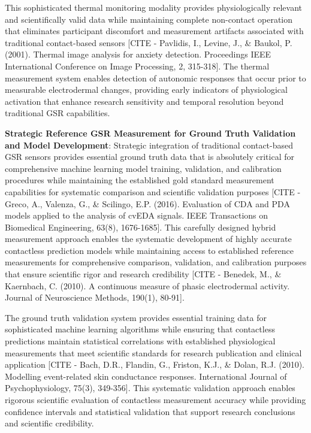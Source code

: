 \documentclass[11pt,a4paper]{report}
\begin{document}
This sophisticated thermal monitoring modality provides physiologically relevant and scientifically valid data while
maintaining complete non-contact operation that eliminates participant discomfort and measurement artifacts associated
with traditional contact-based
sensors [CITE - Pavlidis, I., Levine, J., \& Baukol, P. (2001). Thermal image analysis for anxiety detection. Proceedings IEEE International Conference on Image Processing, 2, 315-318].
The thermal measurement system enables detection of autonomic responses that occur prior to measurable electrodermal
changes, providing early indicators of physiological activation that enhance research sensitivity and temporal
resolution beyond traditional GSR capabilities.

\textbf{Strategic Reference GSR Measurement for Ground Truth Validation and Model Development}: Strategic integration of
traditional contact-based GSR sensors provides essential ground truth data that is absolutely critical for comprehensive
machine learning model training, validation, and calibration procedures while maintaining the established gold standard
measurement capabilities for systematic comparison and scientific validation
purposes [CITE - Greco, A., Valenza, G., \& Scilingo, E.P. (2016). Evaluation of CDA and PDA models applied to the analysis of cvEDA signals. IEEE Transactions on Biomedical Engineering, 63(8), 1676-1685].
This carefully designed hybrid measurement approach enables the systematic development of highly accurate contactless
prediction models while maintaining access to established reference measurements for comprehensive comparison,
validation, and calibration purposes that ensure scientific rigor and research
credibility [CITE - Benedek, M., \& Kaernbach, C. (2010). A continuous measure of phasic electrodermal activity. Journal of Neuroscience Methods, 190(1), 80-91].

The ground truth validation system provides essential training data for sophisticated machine learning algorithms while
ensuring that contactless predictions maintain statistical correlations with established physiological measurements that
meet scientific standards for research publication and clinical
application [CITE - Bach, D.R., Flandin, G., Friston, K.J., \& Dolan, R.J. (2010). Modelling event-related skin conductance responses. International Journal of Psychophysiology, 75(3), 349-356].
This systematic validation approach enables rigorous scientific evaluation of contactless measurement accuracy while
providing confidence intervals and statistical validation that support research conclusions and scientific credibility.
\end{document}
